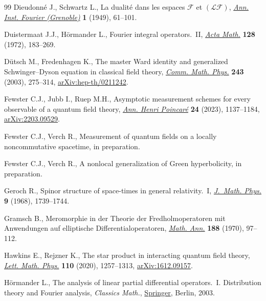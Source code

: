 \documentclass[pdftex]{sigma}
\numberwithin{equation}{section}
\begin{document}
\begin{thebibliography}{99}
Dieudonn\'e J., Schwartz L., La dualit\'e dans les espaces {$\mathcal{F}$} et
 {$(\mathcal{LF})$}, \href{https://doi.org/10.5802/aif.8}{\textit{Ann. Inst. Fourier (Grenoble)}} \textbf{1} (1949),
 61--101.

Duistermaat J.J., H\"ormander L., Fourier integral operators.~{II},
 \href{https://doi.org/10.1007/BF02392165}{\textit{Acta Math.}} \textbf{128} (1972), 183--269.

D\"utsch M., Fredenhagen K., The master {W}ard identity and generalized
 {S}chwinger--{D}yson equation in classical field theory, \href{https://doi.org/10.1007/s00220-003-0968-4}{\textit{Comm. Math.
 Phys.}} \textbf{243} (2003), 275--314, \href{https://arxiv.org/abs/hep-th/0211242}{arXiv:hep-th/0211242}.

Fewster C.J., Jubb I., Ruep M.H., Asymptotic measurement schemes for every
 observable of a quantum field theory, \href{https://doi.org/10.1007/s00023-022-01239-0}{\textit{Ann. Henri Poincar\'e}}
 \textbf{24} (2023), 1137--1184, \href{https://arxiv.org/abs/2203.09529}{arXiv:2203.09529}.

Fewster C.J., Verch R., Measurement of quantum fields on a locally
 noncommutative spacetime, {i}n preparation.

Fewster C.J., Verch R., A nonlocal generalization of {G}reen hyperbolicity,
 {i}n preparation.

Geroch R., Spinor structure of space-times in general relativity.~{I},
 \href{https://doi.org/10.1063/1.1664507}{\textit{J.~Math. Phys.}} \textbf{9} (1968), 1739--1744.

Gramsch B., Meromorphie in der {T}heorie der {F}redholmoperatoren mit
 {A}nwendungen auf elliptische {D}ifferentialoperatoren, \href{https://doi.org/10.1007/BF01350813}{\textit{Math. Ann.}}
 \textbf{188} (1970), 97--112.

Hawkins E., Rejzner K., The star product in interacting quantum field theory,
 \href{https://doi.org/10.1007/s11005-020-01262-4}{\textit{Lett. Math. Phys.}} \textbf{110} (2020), 1257--1313,
 \href{https://arxiv.org/abs/1612.09157}{arXiv:1612.09157}.

H\"ormander L., The analysis of linear partial differential operators.~{I}.
 {D}istribution theory and Fourier analysis, \textit{Classics Math.}, \href{https://doi.org/10.1007/978-3-642-61497-2}{Springer}, Berlin,
 2003.


\end{thebibliography}
\end{document}
